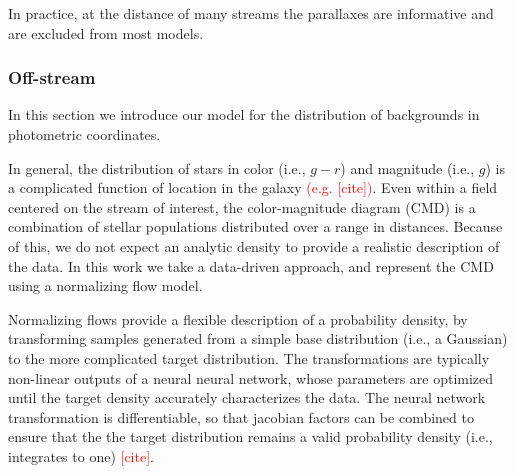 \documentclass[twocolumn]{aastex631}
\newcommand{\TODO}[1]{{\textcolor{red}{#1}}}
\begin{document}


            In practice, at the distance of many streams the parallaxes are informative and are excluded from most models.
    
        \subsubsection{Off-stream} \label{sub:photometric_model_off_stream}
            In this section we introduce our model for the distribution of backgrounds in photometric coordinates. 

            In general, the distribution of stars in color (i.e., $g-r$) and magnitude (i.e., $g$) is a complicated function of location in the galaxy \TODO{(e.g. [cite])}. Even within a field centered on the stream of interest, the color-magnitude diagram (CMD) is a combination of stellar populations distributed over a range in distances. Because of this, we do not expect an analytic density to provide a realistic description of the data. In this work we take a data-driven approach, and represent the CMD using a normalizing flow model.

            Normalizing flows provide a flexible description of a probability density, by transforming samples generated from a simple base distribution (i.e., a Gaussian) to the more complicated target distribution. The transformations are typically non-linear outputs of a neural neural network, whose parameters are optimized until the target density accurately characterizes the data. The neural network transformation is differentiable, so that jacobian factors can be combined to ensure that the the target distribution remains a valid probability density (i.e., integrates to one) \TODO{[cite]}.  
\end{document}
